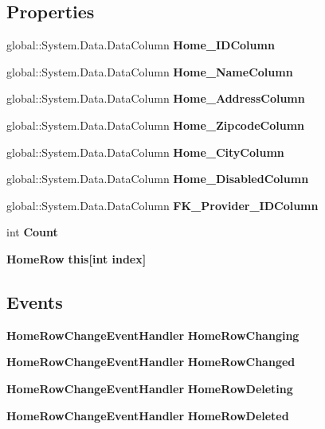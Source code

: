 \subsection*{Properties}
\begin{DoxyCompactItemize}
\item 
global\+::\+System.\+Data.\+Data\+Column \textbf{ Home\+\_\+\+I\+D\+Column}\hspace{0.3cm}{\ttfamily  [get]}
\item 
global\+::\+System.\+Data.\+Data\+Column \textbf{ Home\+\_\+\+Name\+Column}\hspace{0.3cm}{\ttfamily  [get]}
\item 
global\+::\+System.\+Data.\+Data\+Column \textbf{ Home\+\_\+\+Address\+Column}\hspace{0.3cm}{\ttfamily  [get]}
\item 
global\+::\+System.\+Data.\+Data\+Column \textbf{ Home\+\_\+\+Zipcode\+Column}\hspace{0.3cm}{\ttfamily  [get]}
\item 
global\+::\+System.\+Data.\+Data\+Column \textbf{ Home\+\_\+\+City\+Column}\hspace{0.3cm}{\ttfamily  [get]}
\item 
global\+::\+System.\+Data.\+Data\+Column \textbf{ Home\+\_\+\+Disabled\+Column}\hspace{0.3cm}{\ttfamily  [get]}
\item 
global\+::\+System.\+Data.\+Data\+Column \textbf{ F\+K\+\_\+\+Provider\+\_\+\+I\+D\+Column}\hspace{0.3cm}{\ttfamily  [get]}
\item 
int \textbf{ Count}\hspace{0.3cm}{\ttfamily  [get]}
\item 
\textbf{ Home\+Row} \textbf{ this[int index]}\hspace{0.3cm}{\ttfamily  [get]}
\end{DoxyCompactItemize}
\subsection*{Events}
\begin{DoxyCompactItemize}
\item 
\textbf{ Home\+Row\+Change\+Event\+Handler} \textbf{ Home\+Row\+Changing}
\item 
\textbf{ Home\+Row\+Change\+Event\+Handler} \textbf{ Home\+Row\+Changed}
\item 
\textbf{ Home\+Row\+Change\+Event\+Handler} \textbf{ Home\+Row\+Deleting}
\item 
\textbf{ Home\+Row\+Change\+Event\+Handler} \textbf{ Home\+Row\+Deleted}
\end{DoxyCompactItemize}


